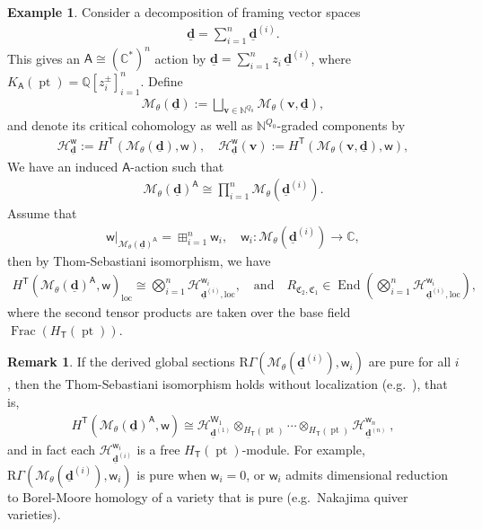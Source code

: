 \documentclass[10pt]{amsart}
\theoremstyle{definition}
\newtheorem{Remark}[Theorem]{Remark}
\newtheorem{Example}[Theorem]{Example}
\numberwithin{equation}{section}
\newcommand{\bC}{\mathbb{C}}
\newcommand{\bN}{\mathbb{N}}
\newcommand{\bQ}{\mathbb{Q}}
\newcommand{\bv}{\mathbf{v}}
\newcommand{\bd}{\mathbf{d}}
\newcommand{\cM}{\mathcal{M}}
\newcommand{\fC}{\mathfrak{C}}
\newcommand{\sA}{\mathsf{A}}
\newcommand{\sT}{\mathsf{T}}
\newcommand{\sW}{\mathsf{W}}
\newcommand{\sw}{\mathsf{w}}
\newcommand{\End}{\operatorname{End}}
\newcommand{\Frac}{\operatorname{Frac}}
\newcommand{\pt}{\operatorname{pt}}
\begin{document}
\begin{Example}\label{ex R-matrix for quiver}
Consider a decomposition of framing vector spaces  
\begin{align*}
    \underline{\bd}=\sum_{i=1}^n \underline{\bd}^{(i)}.
\end{align*}
This gives an $\sA\cong (\bC^*)^n$ action by $\underline{\bd}=\sum_{i=1}^n z_i\,\underline{\bd}^{(i)}$, where $K_\sA(\pt)=\bQ[z_i^\pm]_{i=1}^n$. Define
\begin{align*}
    \cM_\theta(\underline{\bd}):=\bigsqcup_{\bv\in \bN^{Q_0}} \cM_\theta(\bv,\underline{\bd}),
\end{align*}
and denote its critical cohomology as well as $\bN^{Q_0}$-graded components by
\begin{align}\label{state space}
\mathcal H_{\underline{\bd}}^{\sw}:=H^\sT(\cM_\theta(\underline{\bd}),\sw),\quad \mathcal H_{\underline{\bd}}^{\sw}(\bv):=H^\sT(\cM_\theta(\bv,\underline{\bd}),\sw),
\end{align}
We have an induced $\sA$-action such that 
\begin{align*}
    \cM_\theta(\underline{\bd})^{\sA}\cong\prod_{i=1}^n \cM_\theta(\underline{\bd}^{(i)}).
\end{align*}
Assume that 
\begin{align}\label{eq potential splits}
    \sw|_{\cM_\theta(\underline{\bd})^{\sA}}=\boxplus_{i=1}^n\sw_i,\quad \sw_i\colon \cM_\theta(\underline{\bd}^{(i)})\to \bC,
\end{align}
then by Thom-Sebastiani isomorphism, we have
\begin{align*}
    H^\sT(\cM_\theta(\underline{\bd})^\sA,\sw)_{\mathrm{loc}}\cong \bigotimes_{i=1}^n \mathcal H^{\sw_i}_{\underline{\bd}^{(i)},\mathrm{loc}},\quad \text{and}\quad R_{\fC_2,\fC_1}\in \End\left(\bigotimes_{i=1}^n \mathcal H^{\sw_i}_{\underline{\bd}^{(i)},\mathrm{loc}}\right),
\end{align*}
where the second tensor products are taken over the base field $\Frac(H_\sT(\pt))$. 
\end{Example}
\begin{Remark}\label{rmk purity and tensor prod}
If the derived global sections $\mathrm{R}\Gamma(\cM_\theta(\underline{\bd}^{(i)}),\sw_i)$ are pure for all $i$, then the Thom-Sebastiani isomorphism holds without localization (e.g.~\cite[Thm.~ A.1.10]{Zhu}), that is,
\begin{align*}
    H^\sT(\cM_\theta(\underline{\bd})^\sA,\sw )\cong \mathcal H^{\sW_1}_{\underline{\bd}^{(1)}}\otimes_{H_\sT(\pt)}\cdots\otimes_{H_\sT(\pt)}\mathcal H^{\sw_n}_{\underline{\bd}^{(n)}}\:,
\end{align*}
and in fact each $\mathcal H^{\sw_i}_{\underline{\bd}^{(i)}}$ is a free $H_\sT(\pt)$-module. For example, $\mathrm{R}\Gamma(\cM_\theta(\underline{\bd}^{(i)}),\sw_i)$ is pure when $\sw_i=0$, or $\sw_i$ admits dimensional reduction to Borel-Moore homology of a variety that is pure (e.g.~Nakajima quiver varieties).
\end{Remark}
\end{document}
